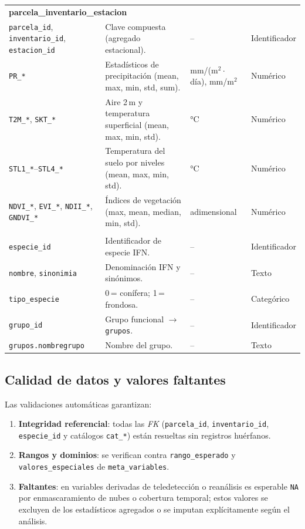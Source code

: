 \begin{longtable}{p{3.2cm} p{7.6cm} p{2.4cm} p{2.4cm}}
\multicolumn{4}{l}{\textbf{parcela\_inventario\_estacion}} \\
\texttt{parcela\_id}, \texttt{inventario\_id}, \texttt{estacion\_id} & Clave compuesta (agregado estacional). & -- & Identificador \\
\texttt{PR\_*} & Estadísticos de precipitación (mean, max, min, std, sum). & mm/(m$^2\cdot$día), mm/m$^2$ & Numérico \\
\texttt{T2M\_*}, \texttt{SKT\_*} & Aire 2\,m y temperatura superficial (mean, max, min, std). & °C & Numérico \\
\texttt{STL1\_*}--\texttt{STL4\_*} & Temperatura del suelo por niveles (mean, max, min, std). & °C & Numérico \\
\texttt{NDVI\_*}, \texttt{EVI\_*}, \texttt{NDII\_*}, \texttt{GNDVI\_*} & Índices de vegetación (max, mean, median, min, std). & adimensional & Numérico \\
\addlinespace

\multicolumn{4}{l}{\textbf{especies} y \textbf{grupos}} \\
\texttt{especie\_id} & Identificador de especie IFN. & -- & Identificador \\
\texttt{nombre}, \texttt{sinonimia} & Denominación IFN y sinónimos. & -- & Texto \\
\texttt{tipo\_especie} & 0\,= conífera; 1\,= frondosa. & -- & Categórico \\
\texttt{grupo\_id} & Grupo funcional $\rightarrow$ \texttt{grupos}. & -- & Identificador \\
\texttt{grupos.nombregrupo} & Nombre del grupo. & -- & Texto \\
\end{longtable}
\normalsize
\subsection*{Calidad de datos y valores faltantes}

Las validaciones automáticas garantizan:
\begin{enumerate}
  \item \textbf{Integridad referencial}: todas las \textit{FK} (\texttt{parcela\_id}, \texttt{inventario\_id}, \texttt{especie\_id} y catálogos \texttt{cat\_*}) están resueltas sin registros huérfanos.
  \item \textbf{Rangos y dominios}: se verifican contra \texttt{rango\_esperado} y \texttt{valores\_especiales} de \texttt{meta\_variables}.
  \item \textbf{Faltantes}: en variables derivadas de teledetección o reanálisis es esperable \texttt{NA} por enmascaramiento de nubes o cobertura temporal; estos valores se excluyen de los estadísticos agregados o se imputan explícitamente según el análisis.
\end{enumerate}
